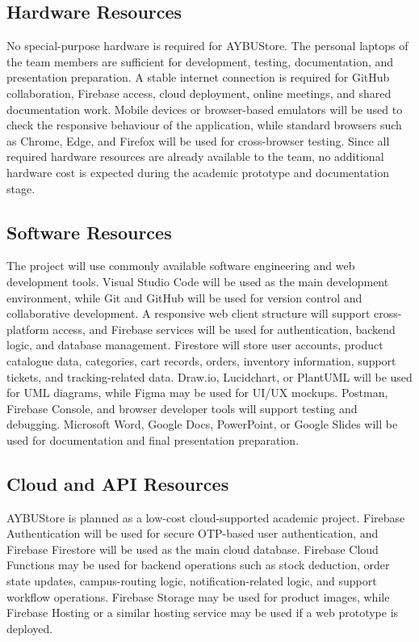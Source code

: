 \documentclass[11pt,a4paper]{article}
\begin{document}
\subsection{Hardware Resources}

No special-purpose hardware is required for AYBUStore. The personal laptops
of the team members are sufficient for development, testing, documentation,
and presentation preparation. A stable internet connection is required for
GitHub collaboration, Firebase access, cloud deployment, online meetings,
and shared documentation work. Mobile devices or browser-based emulators
will be used to check the responsive behaviour of the application, while
standard browsers such as Chrome, Edge, and Firefox will be used for
cross-browser testing. Since all required hardware resources are already
available to the team, no additional hardware cost is expected during the
academic prototype and documentation stage.

\subsection{Software Resources}

The project will use commonly available software engineering and web
development tools. Visual Studio Code will be used as the main development
environment, while Git and GitHub will be used for version control and
collaborative development. A responsive web client structure will support
cross-platform access, and Firebase services will be used for authentication,
backend logic, and database management. Firestore will store user accounts,
product catalogue data, categories, cart records, orders, inventory
information, support tickets, and tracking-related data. Draw.io, Lucidchart,
or PlantUML will be used for UML diagrams, while Figma may be used for UI/UX
mockups. Postman, Firebase Console, and browser developer tools will support
testing and debugging. Microsoft Word, Google Docs, PowerPoint, or Google
Slides will be used for documentation and final presentation preparation.

\subsection{Cloud and API Resources}

AYBUStore is planned as a low-cost cloud-supported academic project. Firebase
Authentication will be used for secure OTP-based user authentication, and
Firebase Firestore will be used as the main cloud database. Firebase Cloud
Functions may be used for backend operations such as stock deduction, order
state updates, campus-routing logic, notification-related logic, and support
workflow operations. Firebase Storage may be used for product images, while
Firebase Hosting or a similar hosting service may be used if a web prototype
is deployed.
\end{document}
